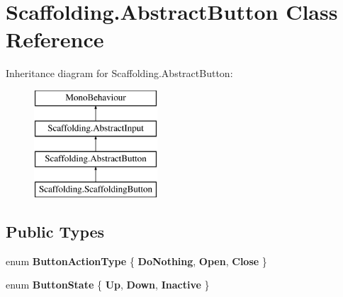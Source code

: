 \hypertarget{class_scaffolding_1_1_abstract_button}{\section{Scaffolding.\+Abstract\+Button Class Reference}
\label{class_scaffolding_1_1_abstract_button}
}
Inheritance diagram for Scaffolding.\+Abstract\+Button\+:\begin{figure}[H]
\begin{center}
\leavevmode
\includegraphics[height=4.000000cm]{class_scaffolding_1_1_abstract_button}
\end{center}
\end{figure}
\subsection*{Public Types}
\begin{DoxyCompactItemize}
\item 
\hypertarget{class_scaffolding_1_1_abstract_button_a8570e566f4323db9e5b65bf214ec5bc4}{enum {\bfseries Button\+Action\+Type} \{ {\bfseries Do\+Nothing}, 
{\bfseries Open}, 
{\bfseries Close}
 \}}\label{class_scaffolding_1_1_abstract_button_a8570e566f4323db9e5b65bf214ec5bc4}

\item 
\hypertarget{class_scaffolding_1_1_abstract_button_ab12f25762012b4eaf00e4a8036cb715b}{enum {\bfseries Button\+State} \{ {\bfseries Up}, 
{\bfseries Down}, 
{\bfseries Inactive}
 \}}\label{class_scaffolding_1_1_abstract_button_ab12f25762012b4eaf00e4a8036cb715b}

\end{DoxyCompactItemize}
